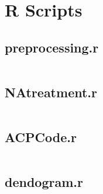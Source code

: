 

\section{R Scripts}%
\label{sec:r_scripts}

\newcommand{\mintedfile}[1]{
    \subsection{#1}%
    \label{ssub:#1}
    \inputminted{r}{../../analysis/#1}
    \pagebreak
}

\mintedfile{preprocessing.r}
\mintedfile{NAtreatment.r}
\mintedfile{ACPCode.r}
\mintedfile{dendogram.r}

